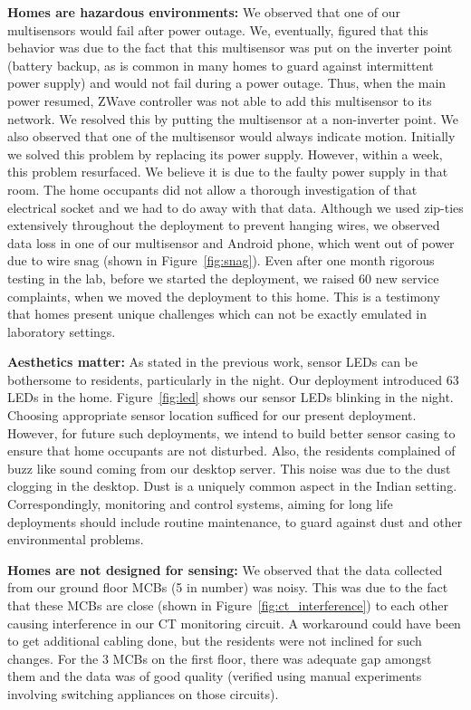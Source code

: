\documentclass[10pt]{sensys-proc}
\newcommand{\figref}[1]{Figure~\ref{#1}}
\begin{document}
\noindent \textbf{Homes are hazardous environments:} We observed that one of our multisensors would fail after power outage. %
We, eventually, figured that this behavior was due to the fact that this multisensor was put on the inverter point (battery backup, as is common in many homes to guard against intermittent power supply) and would not fail during a power outage. Thus, when the main power resumed, ZWave controller was not able to add this multisensor to its network. We resolved this by putting the multisensor at a non-inverter point. We also observed that one of the multisensor would always indicate motion. Initially we solved this problem by replacing its power supply. However, within a week, this problem resurfaced. We believe it is due to the faulty power supply in that room. The home occupants did not allow a thorough investigation of that electrical socket and we had to do away with that data.
Although we used zip-ties extensively throughout the deployment to prevent hanging wires, we observed data loss in one of our multisensor and Android phone, which went out of power due to wire snag (shown in \figref{fig:snag}). Even after one month rigorous testing in the lab, before we started the deployment, we raised 60 new service complaints, when we moved the deployment to this home. This is a testimony that homes present unique challenges which can not be exactly emulated in laboratory settings.

\noindent \textbf{Aesthetics matter:} As stated in the previous work, sensor LEDs can be bothersome to residents, particularly in the night. Our deployment introduced 63 LEDs in the home. \figref{fig:led} shows our sensor LEDs blinking in the night. Choosing appropriate sensor location sufficed for our present deployment. However, for future such deployments, we intend to build better sensor casing to ensure that home occupants are not disturbed. Also, the residents complained of buzz like sound coming from our desktop server. This noise was due to the dust clogging in the desktop. Dust is a uniquely common aspect in the Indian setting. Correspondingly, {monitoring and control systems, aiming for long life deployments should include routine maintenance, to guard against dust and other environmental problems.}

\noindent \textbf{Homes are not designed for sensing:} We observed that the data collected from our ground floor MCBs (5 in number) was noisy. This was due to the fact that these MCBs are close (shown in \figref{fig:ct_interference}) to each other causing interference in our CT monitoring circuit. A workaround could have been to get additional cabling done, but the residents were not inclined for such changes. For the 3 MCBs on the first floor, there was adequate gap amongst them and the data was of good quality (verified using manual experiments involving switching appliances on those circuits). %
\end{document}
